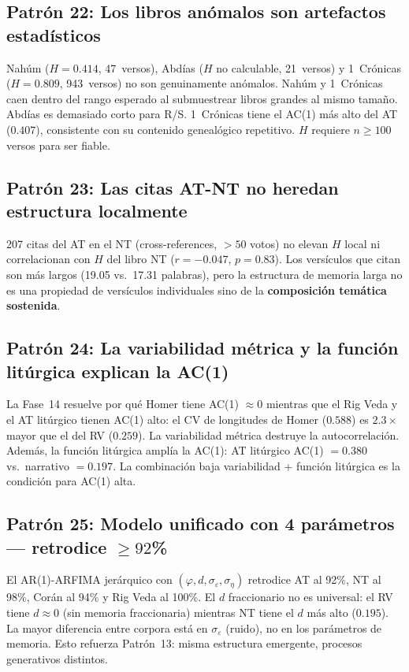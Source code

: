\documentclass[12pt,a4paper]{article}
\begin{document}
\subsection{Patr\'on 22: Los libros an\'omalos son artefactos estad\'isticos}

Nah\'um ($H = 0.414$, 47~versos), Abd\'ias ($H$ no calculable, 21~versos)
y 1~Cr\'onicas ($H = 0.809$, 943~versos) no son genuinamente an\'omalos.
Nah\'um y 1~Cr\'onicas caen dentro del rango esperado al submuestrear libros
grandes al mismo tama\~no. Abd\'ias es demasiado corto para R/S.
1~Cr\'onicas tiene el AC(1) m\'as alto del AT ($0.407$), consistente con
su contenido geneal\'ogico repetitivo. $H$ requiere $n \geq 100$ versos
para ser fiable.

\subsection{Patr\'on 23: Las citas AT-NT no heredan estructura localmente}

207 citas del AT en el NT (cross-references, $> 50$ votos) no elevan
$H$ local ni correlacionan con $H$ del libro NT ($r = -0.047$, $p = 0.83$).
Los vers\'iculos que citan son m\'as largos (19.05 vs.\ 17.31 palabras),
pero la estructura de memoria larga no es una propiedad de vers\'iculos
individuales sino de la \textbf{composici\'on tem\'atica sostenida}.

\subsection{Patr\'on 24: La variabilidad m\'etrica y la funci\'on lit\'urgica explican la AC(1)}

La Fase~14 resuelve por qu\'e Homer tiene AC(1) $\approx 0$ mientras que
el Rig Veda y el AT lit\'urgico tienen AC(1) alto: el CV de longitudes de
Homer ($0.588$) es $2.3\times$ mayor que el del RV ($0.259$). La variabilidad
m\'etrica destruye la autocorrelaci\'on. Adem\'as, la funci\'on lit\'urgica
ampl\'ia la AC(1): AT lit\'urgico AC(1) $= 0.380$ vs.\ narrativo $= 0.197$.
La combinaci\'on baja variabilidad + funci\'on lit\'urgica es la condici\'on
para AC(1) alta.

\subsection{Patr\'on 25: Modelo unificado con 4 par\'ametros --- retrodice $\geq 92$\%}

El AR(1)-ARFIMA jer\'arquico con $(\varphi, d, \sigma_\varepsilon, \sigma_\eta)$
retrodice AT al 92\%, NT al 98\%, Cor\'an al 94\% y Rig Veda al 100\%.
El $d$ fraccionario no es universal: el RV tiene $d \approx 0$ (sin
memoria fraccionaria) mientras NT tiene el $d$ m\'as alto ($0.195$).
La mayor diferencia entre corpora est\'a en $\sigma_\varepsilon$ (ruido),
no en los par\'ametros de memoria. Esto refuerza Patr\'on~13: misma estructura
emergente, procesos generativos distintos.
\end{document}
